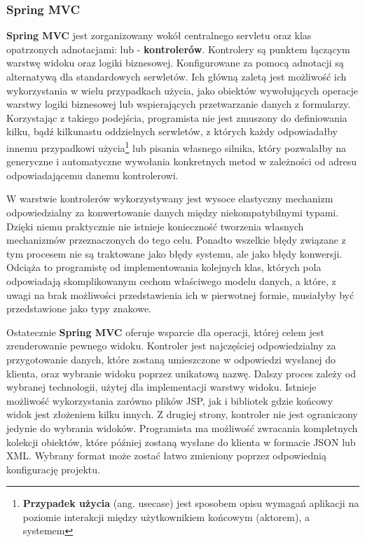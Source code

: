 		\subsubsection{Spring MVC}
		\label{app:spring_mvc}
		\textbf{Spring MVC} jest zorganizowany wokół centralnego servletu  oraz klas opatrzonych adnotacjami:  lub  - \textbf{kontrolerów}. Kontrolery są punktem łączącym warstwę widoku oraz logiki biznesowej. Konfigurowane za pomocą adnotacji są alternatywą dla standardowych serwletów. Ich główną zaletą jest możliwość ich wykorzystania w wielu przypadkach użycia, jako obiektów wywołujących operacje warstwy logiki biznesowej lub wspierających przetwarzanie danych z formularzy. Korzystając z takiego podejścia, programista nie jest zmuszony do definiowania kilku, bądź kilkunastu oddzielnych serwletów, z których każdy odpowiadałby innemu przypadkowi użycia\footnote{\textbf{Przypadek użycia} (ang. usecase) jest sposobem opisu wymagań aplikacji na poziomie interakcji między użytkownikiem końcowym (aktorem), a systemem} lub pisania własnego silnika, który pozwalałby na generyczne i automatyczne wywołania konkretnych metod w zależności od adresu odpowiadającemu danemu kontrolerowi. 
		
		W warstwie kontrolerów wykorzystywany jest wysoce elastyczny mechanizm odpowiedzialny za konwertowanie danych między niekompatybilnymi typami. Dzięki niemu praktycznie nie istnieje konieczność tworzenia własnych mechanizmów przeznaczonych do tego celu. Ponadto wszelkie błędy związane z tym procesem nie są traktowane jako błędy systemu, ale jako błędy konwersji. Odciąża to programistę od implementowania kolejnych klas, których pola odpowiadają skomplikowanym cechom właściwego modelu danych, a które, z uwagi na brak możliwości przedstawienia ich w pierwotnej formie, musiałyby być przedstawione jako typy znakowe. 
		
		Ostatecznie \textbf{Spring MVC} oferuje wsparcie dla operacji, której celem jest zrenderowanie pewnego widoku. Kontroler jest najczęściej odpowiedzialny za przygotowanie danych, które zostaną umieszczone w odpowiedzi wysłanej do klienta, oraz wybranie widoku poprzez unikatową nazwę. Dalszy proces zależy od wybranej technologii, użytej dla implementacji warstwy widoku. Istnieje możliwość wykorzystania zarówno plików JSP, jak i bibliotek gdzie końcowy widok jest złożeniem kilku innych. Z drugiej strony, kontroler nie jest ograniczony jedynie do wybrania widoków. Programista ma możliwość zwracania kompletnych kolekcji obiektów, które później zostaną wysłane do klienta w formacie JSON lub XML. Wybrany format może zostać łatwo zmieniony poprzez odpowiednią konfigurację projektu. 
		
